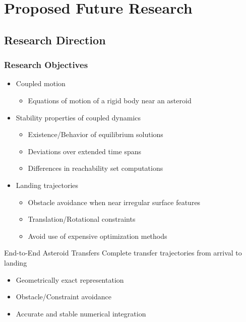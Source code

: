\section[Future Research]{Proposed Future Research}
\subsection[Objectives]{Research Direction}

\begin{frame}[t]\frametitle{Research Objectives}

    \begin{itemize}
        \item Coupled motion
        \begin{itemize}
            \item Equations of motion of a rigid body near an asteroid
        \end{itemize}
        \item Stability properties of coupled dynamics
        \begin{itemize}
            \item Existence/Behavior of equilibrium solutions
            \item Deviations over extended time spans
            \item Differences in reachability set computations
        \end{itemize}
        \item Landing trajectories
        \begin{itemize}
            \item Obstacle avoidance when near irregular surface features
            \item Translation/Rotational constraints
            \item Avoid use of expensive optimization methods
        \end{itemize}
    \end{itemize}
    \pause
    \begin{block}{End-to-End Asteroid Transfers}
        Complete transfer trajectories from arrival to landing
        \begin{itemize}
            \item Geometrically exact representation
            \item Obstacle/Constraint avoidance
            \item Accurate and stable numerical integration
        \end{itemize}
    \end{block}
\end{frame}